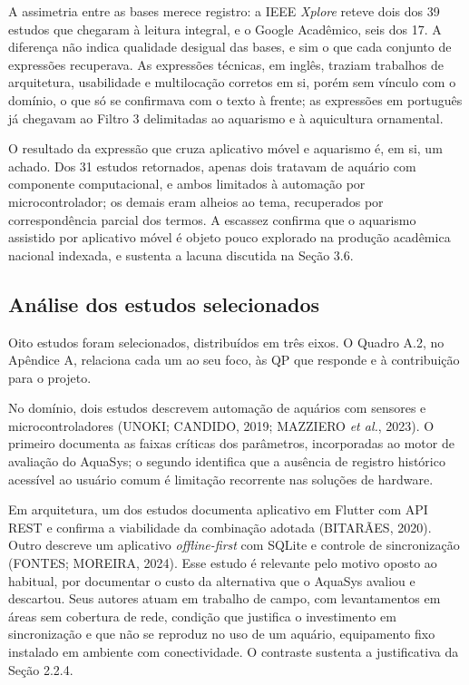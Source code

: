 \documentclass[12pt,oneside,a4paper,brazilian]{abntex2}
\begin{document}
A assimetria entre as bases merece registro: a IEEE \textit{Xplore} reteve dois dos 39 estudos que chegaram à leitura integral, e o Google Acadêmico, seis dos 17. A diferença não indica qualidade desigual das bases, e sim o que cada conjunto de expressões recuperava. As expressões técnicas, em inglês, traziam trabalhos de arquitetura, usabilidade e multilocação corretos em si, porém sem vínculo com o domínio, o que só se confirmava com o texto à frente; as expressões em português já chegavam ao Filtro 3 delimitadas ao aquarismo e à aquicultura ornamental.

O resultado da expressão que cruza aplicativo móvel e aquarismo é, em si, um achado. Dos 31 estudos retornados, apenas dois tratavam de aquário com componente computacional, e ambos limitados à automação por microcontrolador; os demais eram alheios ao tema, recuperados por correspondência parcial dos termos. A escassez confirma que o aquarismo assistido por aplicativo móvel é objeto pouco explorado na produção acadêmica nacional indexada, e sustenta a lacuna discutida na Seção 3.6.


\subsection{Análise dos estudos selecionados}
Oito estudos foram selecionados, distribuídos em três eixos. O Quadro A.2, no Apêndice A, relaciona cada um ao seu foco, às QP que responde e à contribuição para o projeto.

No domínio, dois estudos descrevem automação de aquários com sensores e microcontroladores (UNOKI; CANDIDO, 2019; MAZZIERO \textit{et al.}, 2023). O primeiro documenta as faixas críticas dos parâmetros, incorporadas ao motor de avaliação do AquaSys; o segundo identifica que a ausência de registro histórico acessível ao usuário comum é limitação recorrente nas soluções de hardware.

Em arquitetura, um dos estudos documenta aplicativo em Flutter com API REST e confirma a viabilidade da combinação adotada (BITARÃES, 2020). Outro descreve um aplicativo \textit{offline-first} com SQLite e controle de sincronização (FONTES; MOREIRA, 2024). Esse estudo é relevante pelo motivo oposto ao habitual, por documentar o custo da alternativa que o AquaSys avaliou e descartou. Seus autores atuam em trabalho de campo, com levantamentos em áreas sem cobertura de rede, condição que justifica o investimento em sincronização e que não se reproduz no uso de um aquário, equipamento fixo instalado em ambiente com conectividade. O contraste sustenta a justificativa da Seção 2.2.4.
\end{document}
